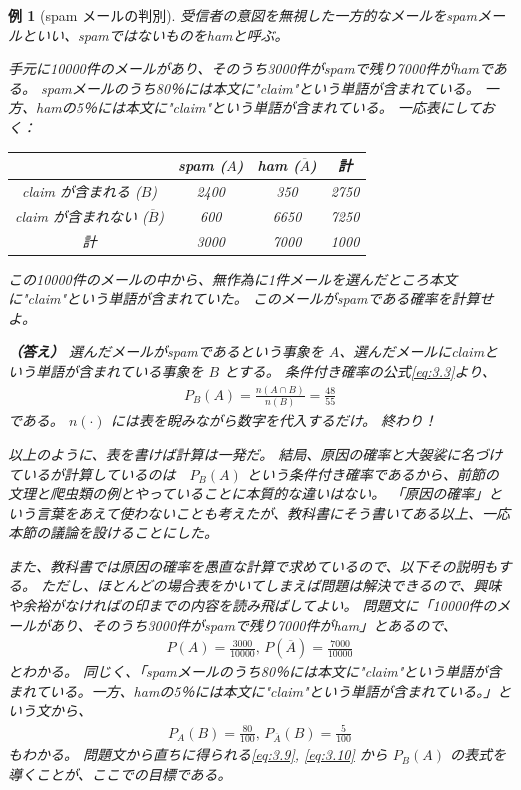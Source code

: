 \documentclass[12pt]{ltjsarticle}\usepackage{ifthen}\newcounter{enlarge}\setcounter{enlarge}{1}
\newtheorem{eg}{例}
\begin{document}
\begin{eg}[spam メールの判別] \label{eg:3.3}
  受信者の意図を無視した一方的なメールをspamメールといい、spamではないものをhamと呼ぶ。

  手元に10000件のメールがあり、そのうち3000件がspamで残り7000件がhamである。
  spamメールのうち80％には本文に"claim"という単語が含まれている。
  一方、hamの5％には本文に"claim"という単語が含まれている。
  一応表にしておく：

  \begin{center}
  \begin{tabular}{c|cc|c} \hline
    & spam  ($A$) & ham ($\overline{A}$) & 計 \\ \hline
    claim が含まれる ($B$) & 2400 & 350 & 2750 \\
    claim が含まれない ($\overline{B}$) & 600 & 6650 & 7250 \\ \hline
    計 & 3000 & 7000 & 1000 \\ \hline
  \end{tabular}
  \end{center}

  この10000件のメールの中から、無作為に1件メールを選んだところ本文に"claim"という単語が含まれていた。
  このメールがspamである確率を計算せよ。

  \textbf{（答え）}
  選んだメールがspamであるという事象を $A$、選んだメールにclaimという単語が含まれている事象を $B$ とする。
  条件付き確率の公式\eqref{eq:3.3}より、
  \begin{align}
    P_B (A) = \frac{n(A \cap B)}{n(B)} = \frac{48}{55} \label{eq:3.8}
  \end{align}
  である。
  $n(\cdot)$ には表を睨みながら数字を代入するだけ。
  終わり！

  以上のように、表を書けば計算は一発だ。
  結局、原因の確率と大袈裟に名づけているが計算しているのは　$P_B (A)$ という条件付き確率であるから、前節の文理と爬虫類の例とやっていることに本質的な違いはない。
  「原因の確率」という言葉をあえて使わないことも考えたが、教科書にそう書いてある以上、一応本節の議論を設けることにした。

  また、教科書では原因の確率を愚直な計算で求めているので、以下その説明もする。
  ただし、ほとんどの場合表をかいてしまえば問題は解決できるので、興味や余裕がなければの\bigstar 印までの内容を読み飛ばしてよい。
  問題文に「10000件のメールがあり、そのうち3000件がspamで残り7000件がham」とあるので、
  \begin{align} 
    P(A) = \frac{3000}{10000},\, P(\overline{A}) = \frac{7000}{10000} \label{eq:3.9}
  \end{align}
  とわかる。
  同じく、「spamメールのうち80％には本文に"claim"という単語が含まれている。一方、hamの5％には本文に"claim"という単語が含まれている。」という文から、
  \begin{align} 
    P_A (B) = \frac{80}{100},\, P_{\overline{A}} (B) = \frac{5}{100} \label{eq:3.10}
  \end{align}
  もわかる。
  問題文から直ちに得られる\eqref{eq:3.9}, \eqref{eq:3.10} から $P_B (A)$ の表式を導くことが、ここでの目標である。


\end{eg}
\end{document}
